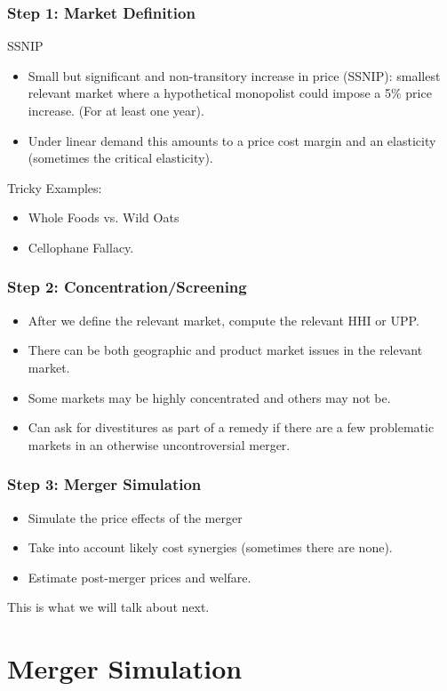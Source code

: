 \documentclass[xcolor=pdftex,dvipsnames,table,mathserif,aspectratio=169]{beamer}
\begin{document}
\begin{frame}
\frametitle{Step 1: Market Definition}
SSNIP
 \begin{itemize}
\item Small but significant and non-transitory increase in price (SSNIP): smallest relevant market where a hypothetical monopolist could impose a 5\% price increase. (For at least one year).
\item Under linear demand this amounts to a price cost margin and an elasticity (sometimes the \alert{critical elasticity}).
 \end{itemize}
 Tricky Examples:
  \begin{itemize}
\item Whole Foods vs. Wild Oats
\item Cellophane Fallacy.
 \end{itemize}
\end{frame}

\begin{frame}
\frametitle{Step 2: Concentration/Screening}
 \begin{itemize}
\item After we define the relevant market, compute the relevant HHI or UPP.
\item There can be both geographic and product market issues in the relevant market.
\item Some markets may be highly concentrated and others may not be.
\item Can ask for \alert{divestitures} as part of a \alert{remedy} if there are a few problematic markets in an otherwise uncontroversial merger.
 \end{itemize}
\end{frame}


\begin{frame}
\frametitle{Step 3: Merger Simulation}
 \begin{itemize}
\item Simulate the price effects of the merger
\item Take into account likely cost synergies (sometimes there are none).
\item Estimate post-merger prices and welfare.
 \end{itemize}
 This is what we will talk about next.
\end{frame}

\section{Merger Simulation}
\end{document}
